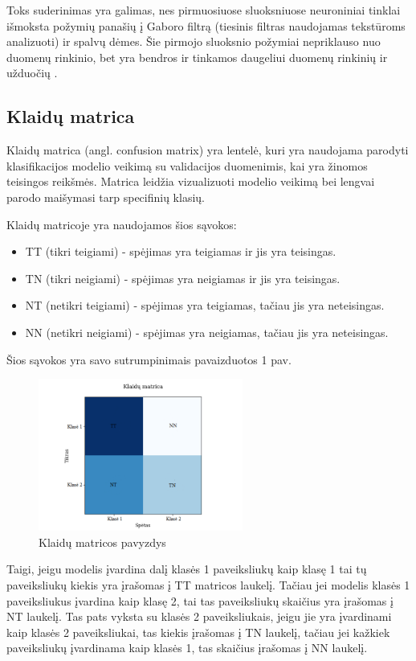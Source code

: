\documentclass{VUMIFPSbakalaurinis}
\begin{document}
Toks suderinimas yra galimas, nes pirmuosiuose sluoksniuose neuroniniai tinklai išmoksta požymių panašių į Gaboro filtrą 
(tiesinis filtras naudojamas tekstūroms analizuoti) ir spalvų dėmes. Šie pirmojo sluoksnio požymiai nepriklauso nuo duomenų rinkinio, bet yra bendros ir tinkamos 
daugeliui duomenų rinkinių ir užduočių \cite{DBLP:journals/corr/YosinskiCBL14}.

\subsection{Klaidų matrica}
Klaidų matrica (angl. confusion matrix) yra lentelė, kuri yra naudojama parodyti klasifikacijos modelio veikimą su validacijos duomenimis, kai yra žinomos teisingos reikšmės. Matrica leidžia vizualizuoti modelio veikimą bei lengvai parodo maišymasi tarp specifinių klasių.

Klaidų matricoje yra naudojamos šios sąvokos:
\begin{itemize}
    \item TT (tikri teigiami) - spėjimas yra teigiamas ir jis yra teisingas.
    \item TN (tikri neigiami) - spėjimas yra neigiamas ir jis yra teisingas.
    \item NT (netikri teigiami) - spėjimas yra teigiamas, tačiau jis yra neteisingas.
    \item NN (netikri neigiami) - spėjimas yra neigiamas, tačiau jis yra neteisingas.
\end{itemize}

Šios sąvokos yra savo sutrumpinimais pavaizduotos 1 pav. 
\begin{figure}[H]
    \centering
    \includegraphics[width=0.6\textwidth]{img/KlaiduMatrica.png}
    \caption{Klaidų matricos pavyzdys}
    \label{fig:architecture}
\end{figure}
Taigi, jeigu modelis įvardina dalį klasės 1 paveiksliukų kaip klasę 1 tai tų paveiksliukų kiekis yra įrašomas į TT matricos laukelį. Tačiau jei modelis klasės 1 paveiksliukus įvardina kaip klasę 2, tai tas paveiksliukų skaičius yra įrašomas į NT laukelį. Tas pats vyksta su klasės 2 paveiksliukais, jeigu jie yra įvardinami kaip klasės 2 paveiksliukai, tas kiekis įrašomas į TN laukelį, tačiau jei kažkiek paveiksliukų įvardinama kaip klasės 1, tas skaičius įrašomas į NN laukelį. 
\end{document}
